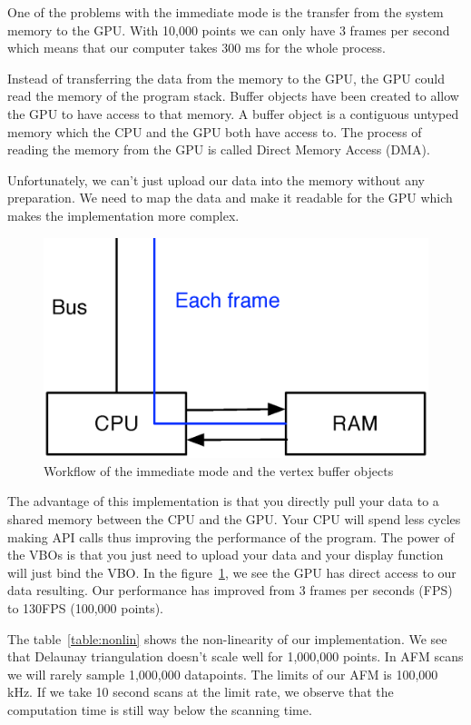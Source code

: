 One of the problems with the immediate mode is the transfer from the system memory to the GPU. With 10,000 points we can only have 3 frames per second which means that our computer takes 300 ms for the whole process.

Instead of transferring the data from the memory to the GPU, the GPU could read the memory of the program stack. Buffer objects have been created to allow the GPU to have access to that memory. A buffer object is a contiguous untyped memory which the CPU and the GPU both have access to. The process of reading the memory from the GPU is called Direct Memory Access (DMA). 

Unfortunately, we can't just upload our data into the memory without any preparation. We need to map the data and make it readable for the GPU which makes the implementation more complex.

\begin{figure}[H]
  \centering
  \includegraphics[scale=0.4]{images/openglVBO.eps}
    \caption{Workflow of the immediate mode and the vertex buffer objects\cite{yaldex}}
  \label{openglVBO}
\end{figure}


The advantage of this implementation is that you directly pull your data to a shared memory between the CPU and the GPU. Your CPU will spend less cycles making API calls thus improving the performance of the program. The power of the VBOs is that you just need to upload your data and your display function will just bind the VBO. In the figure~\ref{openglVBO}, we see the GPU has direct access to our data resulting. Our performance has improved from 3 frames per seconds (FPS) to 130FPS (100,000 points). 

The table~\ref{table:nonlin} shows the non-linearity of our implementation. We see that Delaunay triangulation doesn't scale well for 1,000,000 points. In AFM scans we will rarely sample 1,000,000 datapoints. The limits of our AFM is 100,000 kHz. If we take 10 second scans at the limit rate, we observe that the computation time is still way below the scanning time. 

